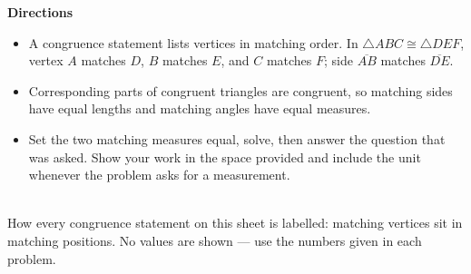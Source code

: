 \documentclass[12pt]{article}
\begin{document}

\noindent\textbf{Directions}
\begin{itemize}[leftmargin=0.8cm, itemsep=1pt, topsep=2pt]
  \item A congruence statement lists vertices in matching order. In
        $\triangle ABC \cong \triangle DEF$, vertex $A$ matches $D$, $B$ matches
        $E$, and $C$ matches $F$; side $\overline{AB}$ matches $\overline{DE}$.
  \item Corresponding parts of congruent triangles are congruent, so matching
        sides have equal lengths and matching angles have equal measures.
  \item Set the two matching measures equal, solve, then answer the question
        that was asked. Show your work in the space provided and include the
        unit whenever the problem asks for a measurement.
\end{itemize}

\vspace{0.15cm}
\begin{center}
\\[2pt]
{\small How every congruence statement on this sheet is labelled: matching
vertices sit in matching positions. No values are shown --- use the numbers
given in each problem.}
\end{center}

\vspace{0.1cm}


\end{document}
